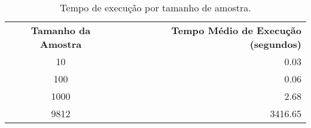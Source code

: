 \begin{table}[htbp]
\centering
\begin{tabular}{|c|r|}
  \hline
	\textbf{Tamanho da Amostra} & \textbf{Tempo Médio de Execução (segundos)} \\ 
  \hhline{|=|=|}
	10 & 0.03 \\ \hline
  100 & 0.06 \\ \hline
  1000 & 2.68 \\ \hline
  9812 & 3416.65 \\ \hline
\end{tabular}
\caption{Tempo de execução por tamanho de amostra.} 
\label{tab:tempo_execucao}
\end{table}
